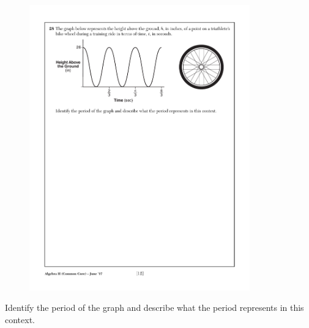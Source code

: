 \vspace{0.5 in}
\begin{figure}[!ht]
    \centering
    \includegraphics[width=0.85\textwidth]{sine-bike-wheel.pdf}
\end{figure}

Identify the period of the graph and describe what the period represents in this context.

